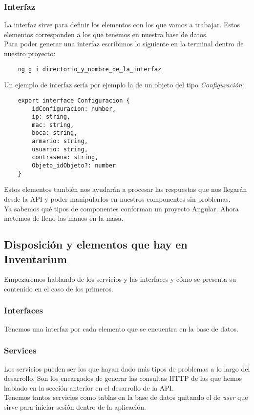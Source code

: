 \subsubsection{Interfaz}
La interfaz sirve para definir los elementos con los que vamos a trabajar. Estos elementos corresponden a los que tenemos en nuestra base de datos.
\\Para poder generar una interfaz escribimos lo siguiente en la terminal dentro de nuestro proyecto:
\begin{verbatim}
    ng g i directorio_y_nombre_de_la_interfaz
\end{verbatim}
Un ejemplo de interfaz sería por ejemplo la de un objeto del tipo \textit{Configuración}:
\begin{verbatim}
    export interface Configuracion {
        idConfiguracion: number,
        ip: string,
        mac: string,
        boca: string,
        armario: string,
        usuario: string,
        contrasena: string,
        Objeto_idObjeto?: number
    }
\end{verbatim}
Estos elementos también nos ayudarán a procesar las respuestas que nos llegarán desde la API y poder manipularlos en nuestros componentes sin problemas.
\vspace{\baselineskip}
\\Ya sabemos qué tipos de componentes conforman un proyecto Angular. Ahora metemos de lleno las manos en la masa.

\subsection{Disposición y elementos que hay en Inventarium}
Empezaremos hablando de los servicios y las interfaces y cómo se presenta su contenido en el caso de los primeros.

\subsubsection{Interfaces}
Tenemos una interfaz por cada elemento que se encuentra en la base de datos.

\subsubsection{Services}
Los servicios pueden ser los que hayan dado más tipos de problemas a lo largo del desarrollo. Son los encargados de generar las consultas HTTP de las que hemos hablado en la sección anterior en el desarrollo de la API.
\\Tenemos tantos servicios como tablas en la base de datos quitando el de \textit{user} que sirve para iniciar sesión dentro de la aplicación.


